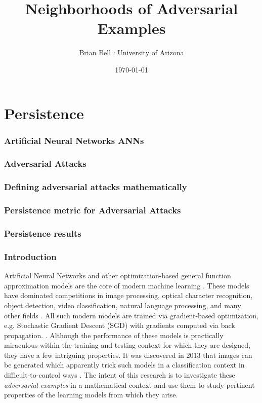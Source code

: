 \documentclass[10pt]{extarticle}
\author{Brian Bell : University of Arizona}
\date{\today}
\title{Neighborhoods of Adversarial Examples}
\begin{document}
\titlepage
\maketitle
\tableofcontents

\part{Persistence}
\section{Artificial Neural Networks ANNs}
\section{Adversarial Attacks}
\section{Defining adversarial attacks mathematically}
\section{Persistence metric for Adversarial Attacks}
\section{Persistence results}
\section{Introduction}

Artificial Neural Networks and other optimization-based general
function approximation models are the core of modern
machine learning \cite{prakash2018}. These models have dominated competitions in image processing, optical character recognition, object detection, video classification, natural language processing, and many other fields \cite{SCHMIDHUBER201585}. All such modern models are
trained via gradient-based optimization, e.g. Stochastic Gradient Descent (SGD) with
gradients computed via back propagation. \cite{goodfellow2013multidigit}. Although the performance of these models is practically
miraculous within the training and testing context for which they are designed, they have a few intriguing properties. It was discovered in 2013 
\cite{Szegedy2013} that images can be generated
which apparently trick such models in a classification context in  difficult-to-control ways \cite{Khoury2018}. The intent of this
research is to investigate these \emph{adversarial examples} in a
mathematical context and use them to study pertinent 
properties of the learning models from which they arise.
\end{document}
